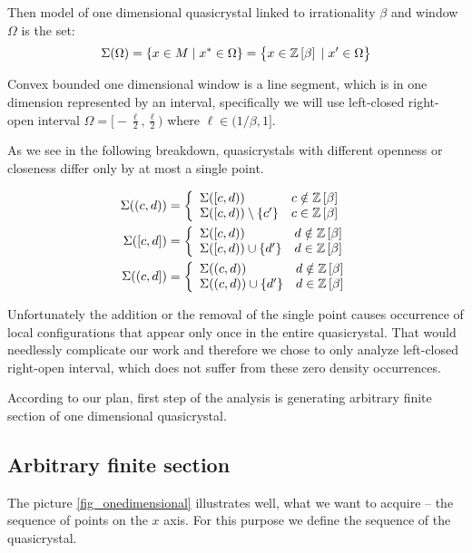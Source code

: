 \documentclass[text.tex]{subfiles}
\begin{document}
Then model of one dimensional quasicrystal linked to irrationality $\beta$ and window $\Omega$ is the set:
$$\Sigma(\Omega) = \{ x \in M\; |\; x^\ast\in \Omega\} = \big\{ x \in \mathbb{Z}\left[\beta\right]\; |\; x'\in \Omega\big\}$$

Convex bounded one dimensional window is a line segment, which is in one dimension represented by an interval, specifically we will use left-closed right-open interval $\Omega = \big[-\frac{\ell}{2}, \frac{\ell}{2}\big)$ where $\ell\in (1/\beta,1]$. 

As we see in the following breakdown, quasicrystals with different openness or closeness differ only by at most a single point. 

\begin{align*}
\Sigma((c,d)) &= \left\{ 
	\begin{array}{l l}
	\Sigma([c,d)) & c \notin \mathbb{Z}\left[\beta\right]\\
	\Sigma([c,d))\setminus\{c'\} & c \in \mathbb{Z}\left[\beta\right]
	\end{array} \right. 
  \\
  \Sigma([c,d]) &= \left\{ 
	\begin{array}{l l}
	\Sigma([c,d)) & d \notin \mathbb{Z}\left[\beta\right]\\
	\Sigma([c,d))\cup\{d'\} & d \in \mathbb{Z}\left[\beta\right]
	\end{array} \right.
  \\
\Sigma((c,d]) &= \left\{ 
	\begin{array}{l l}
	\Sigma((c,d)) & d \notin \mathbb{Z}\left[\beta\right]\\
	\Sigma((c,d))\cup\{d'\} & d \in \mathbb{Z}\left[\beta\right]
	\end{array} \right.\\
\end{align*}

Unfortunately the addition or the removal of the single point causes occurrence of local configurations that appear only once in the entire quasicrystal. That would needlessly complicate our work and therefore we chose to only analyze left-closed right-open interval, which does not suffer from these zero density occurrences. 

According to our plan, first step of the analysis is generating arbitrary finite section of one dimensional quasicrystal. 

\subsection{Arbitrary finite section}
The picture \ref{fig_onedimensional} illustrates well, what we want to acquire -- the sequence of points on the $x$ axis. For this purpose we define the sequence of the quasicrystal. 
\end{document}
